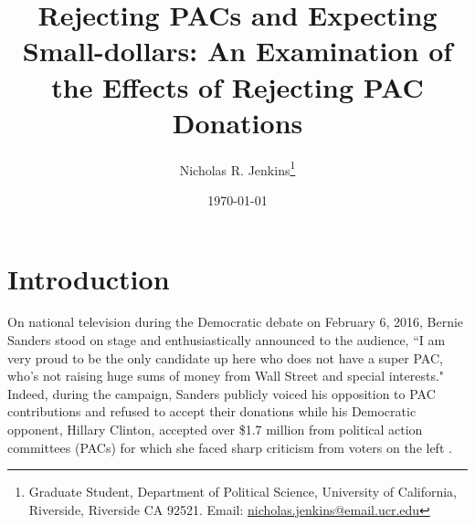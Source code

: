 \documentclass[12pt]{article}
\title{\textbf{Rejecting PACs and Expecting Small-dollars: An Examination of the Effects of Rejecting PAC Donations}}
\author{Nicholas R. Jenkins\thanks{Graduate Student, Department of Political Science, University of California, Riverside, Riverside CA 92521. Email: \href{mailto:nicholas.jenkins@email.ucr.edu}{nicholas.jenkins@email.ucr.edu}}}
\date{\today}
\begin{document}
\maketitle
\thispagestyle{empty}

\pagebreak

\cleardoublepage
\setcounter{page}{1}



\section{Introduction} \label{sec: intro}

On national television during the Democratic debate on February 6, 2016, Bernie Sanders stood on stage and enthusiastically announced to the audience, ``I am very proud to be the only candidate up here who does not have a super PAC, who’s not raising huge sums of money from Wall Street and special interests." Indeed, during the campaign, Sanders publicly voiced his opposition to PAC contributions and refused to accept their donations while his Democratic opponent, Hillary Clinton, accepted over \$1.7 million from political action committees (PACs) for which she faced sharp criticism from voters on the left \citep{harper_2020_2019, ye_hee_lee_sanderss_2016, seitz-wald_promise_2015, bump_why_2016}. 
\end{document}
